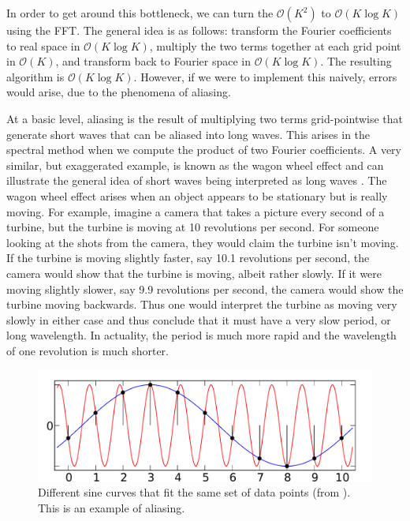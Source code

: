 In order to get around this bottleneck, we can turn the $\mathcal{O}(K^{2})$ to $\mathcal{O}(K\log K)$ using the FFT. The general idea is as follows: transform the Fourier coefficients to real space in $\mathcal{O}(K\log K)$, multiply the two terms together at each grid point in $\mathcal{O}(K)$, and transform back to Fourier space in $\mathcal{O}(K\log K)$. The resulting algorithm is $\mathcal{O}(K\log K)$. However, if we were to implement this naively, errors would arise, due to the phenomena of aliasing. 

At a basic level, aliasing is the result of multiplying two terms grid-pointwise that generate short waves that can be aliased into long waves. This arises in the spectral method when we compute the product of two Fourier coefficients. A very similar, but exaggerated example, is known as the wagon wheel effect and can illustrate the general idea of short waves being interpreted as long waves \cite{wagonwheel}.  The wagon wheel effect arises when an object appears to be stationary but is really moving. For example, imagine a camera that takes a picture every second of a turbine, but the turbine is moving at 10 revolutions per second. For someone looking at the shots from the camera, they would claim the turbine isn't moving. If the turbine is moving slightly faster, say 10.1 revolutions per second, the camera would show that the turbine is moving, albeit rather slowly. If it were moving slightly slower, say 9.9 revolutions per second, the camera would show the turbine moving backwards. Thus one would interpret the turbine as moving very slowly in either case and thus conclude that it must have a very slow period, or long wavelength. In actuality, the period is much more rapid and the wavelength of one revolution is much shorter.  
\begin{figure}
\begin{center}
\includegraphics[width=\textwidth]{aliassine.pdf}
\caption{Different sine curves that fit the same set of data points (from \cite{sinewiki}). This is an example of aliasing.}
\label{aliassine}
\end{center}
\end{figure}

